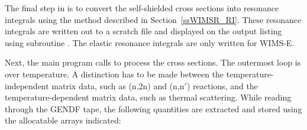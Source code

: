 The final step in  is to convert the self-shielded
cross sections into resonance integrals using the method described
in Section~\ref{ssWIMSR_RI}.  These
resonance integrals are written out to a scratch
file and displayed on the output listing using subroutine .
The elastic resonance integrals are only written for WIMS-E.

Next, the main program calls  to process the cross
sections.  The outermost loop is over temperature.  A distinction
has to be made between the temperature-independent matrix data,
such as (n,2n) and (n,n$'$) reactions, and the temperature-dependent
matrix data, such as thermal scattering.  While reading through
the GENDF tape, the following quantities are extracted and
stored using the allocatable arrays indicated:

